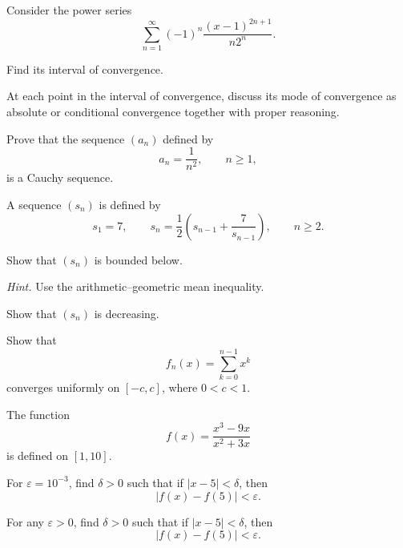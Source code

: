 \begin{problem}
Consider the power series
\[
\sum_{n=1}^{\infty}(-1)^n\frac{(x-1)^{2n+1}}{n2^n}.
\]
\begin{problemsubparts}
\item Find its interval of convergence.
\item At each point in the interval of convergence, discuss its mode of convergence as absolute or conditional convergence together with proper reasoning.
\end{problemsubparts}
\end{problem}

\begin{problem}
Prove that the sequence $(a_n)$ defined by
\[
a_n=\frac{1}{n^2},
\qquad n\ge1,
\]
is a Cauchy sequence.
\end{problem}

\begin{problem}
A sequence $(s_n)$ is defined by
\[
s_1=7,
\qquad
s_n=\frac12\left(s_{n-1}+\frac{7}{s_{n-1}}\right),
\qquad n\ge2.
\]
\begin{problemsubparts}
\item Show that $(s_n)$ is bounded below.

\textit{Hint.} Use the arithmetic--geometric mean inequality.
\item Show that $(s_n)$ is decreasing.
\end{problemsubparts}
\end{problem}

\begin{problem}
Show that
\[
f_n(x)=\sum_{k=0}^{n-1}x^k
\]
converges uniformly on $[-c,c]$, where $0<c<1$.
\end{problem}

\begin{problem}
The function
\[
f(x)=\frac{x^3-9x}{x^2+3x}
\]
is defined on $[1,10]$.
\begin{problemsubparts}
\item For $\varepsilon=10^{-3}$, find $\delta>0$ such that if $|x-5|<\delta$, then
\[
|f(x)-f(5)|<\varepsilon.
\]
\item For any $\varepsilon>0$, find $\delta>0$ such that if $|x-5|<\delta$, then
\[
|f(x)-f(5)|<\varepsilon.
\]
\end{problemsubparts}
\end{problem}

